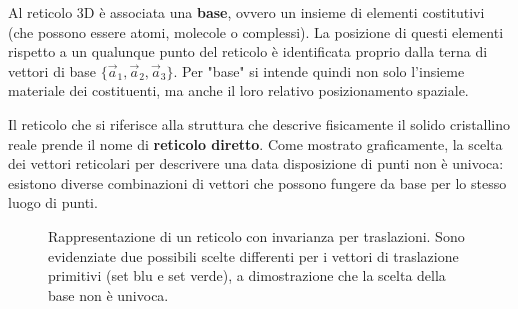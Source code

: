 Al reticolo 3D è associata una \textbf{base}, ovvero un insieme di elementi costitutivi (che possono essere atomi, molecole o complessi). La posizione di questi elementi rispetto a un qualunque punto del reticolo è identificata proprio dalla terna di vettori di base \( \{ \vec{a}_1, \vec{a}_2, \vec{a}_3 \} \). Per "base" si intende quindi non solo l'insieme materiale dei costituenti, ma anche il loro relativo posizionamento spaziale. 

Il reticolo che si riferisce alla struttura che descrive fisicamente il solido cristallino reale prende il nome di \textbf{reticolo diretto}. Come mostrato graficamente, la scelta dei vettori reticolari per descrivere una data disposizione di punti non è univoca: esistono diverse combinazioni di vettori che possono fungere da base per lo stesso luogo di punti.

\begin{figure}[H]
    \centering
    \caption{Rappresentazione di un reticolo con invarianza per traslazioni. Sono evidenziate due possibili scelte differenti per i vettori di traslazione primitivi (set blu e set verde), a dimostrazione che la scelta della base non è univoca.}
\end{figure}

